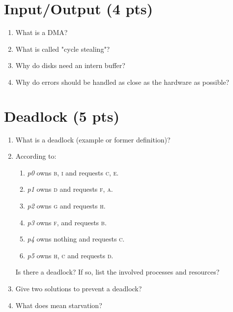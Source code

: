 \documentclass[11pt]{article}
\begin{document}
\section{Input/Output (4 pts)}
	\begin{enumerate}
		\item What is a DMA? %
		\vspace{1cm}
		\item What is called "cycle stealing"? %
		\vspace{1cm}
		\item Why do disks need an intern buffer? %
		\vspace{1cm}
		\item Why do errors should be handled as close as the hardware as possible? %
		\vspace{1cm}
	\end{enumerate}

\section{Deadlock (5 pts)}
	\begin{enumerate}
		\item What is a deadlock (example or former definition)? %
		\vspace{1cm}
		\item According to: %
		\begin{enumerate}
			\item \emph{p0} owns {\scshape b}, {\scshape i} and requests {\scshape c}, {\scshape e}.
			\item \emph{p1} owns {\scshape d} and requests {\scshape f}, {\scshape a}.
			\item \emph{p2} owns {\scshape g} and requests {\scshape h}.
			\item \emph{p3} owns {\scshape f}, and requests {\scshape b}.
			\item \emph{p4} owns nothing and requests {\scshape c}.
			\item \emph{p5} owns {\scshape h}, {\scshape c} and requests {\scshape d}.
		\end{enumerate}
		Is there a deadlock? If so, list the involved processes and resources? %
		\vspace{1cm}
		\item Give two solutions to prevent a deadlock? %
		\vspace{2cm}
		\item What does mean starvation? %
		\vspace{1cm}
	\end{enumerate}
\end{document}
